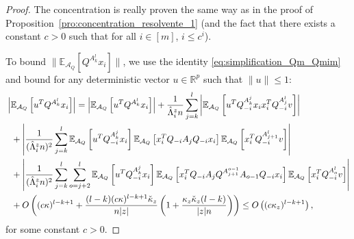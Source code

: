 \documentclass[a4papaer, titlepage]{book}
\begin{document}
\begin{proof}
  The concentration is really proven the same way as in the proof of Proposition~\ref{pro:concentration_resolvente_1} (and the fact that there exists a constant $c>0$ such that for all $i\in[m]$, $i \leq c^i$).

  To bound $\|\mathbb E_{\mathcal A_Q}[Q^{A_k^l}x_i]\|$, we use the identity \eqref{eq:simplification_Qm_Qmim} and bound for any deterministic vector $u\in \mathbb R^p$ such that $\|u\| \leq 1$:
  \begin{align*}
    &\left\vert \mathbb E_{\mathcal A_Q} \left[  u^TQ^{A_k^l}x_i \right] \right\vert
    = \left\vert \mathbb E_{\mathcal A_Q} \left[  u^TQ^{A_k^l}x_i \right] \right\vert
    + \frac{1}{\hat \Lambda_i^zn}\sum_{j=k}^l \left\vert \mathbb E_{\mathcal A_Q} \left[ u^TQ_{-i}^{A_k^{j}}x_ix_i^TQ_{-i}^{A_{j}^{l}}v \right] \right\vert \\
    &\hspace{0.2cm}  + \left\vert \frac{1}{(\hat \Lambda_i^zn)^2}\sum_{j=k}^l \mathbb E_{\mathcal A_Q} \left[u^T Q_{-i}^{A_k^{j}}x_i\right] \mathbb E_{\mathcal A_Q} \left[x_i^TQ_{-i}A_jQ_{-i}x_i\right] \mathbb E_{\mathcal A_Q} \left[x_i^TQ_{-i}^{A^{l}_{j+1}}v\right] \right\vert\\ 
    &\hspace{0.2cm} + \left\vert \frac{1}{(\hat\Lambda_i^zn)^2}\sum_{j=k}^l \sum_{o=j+2}^l \mathbb E_{\mathcal A_Q} \left[u^T Q_{-i}^{A_k^{j}}x_i\right] \mathbb E_{\mathcal A_Q} \left[x_i^TQ_{-i}A_jQ^{A_{j+1}^{o-1}}A_{o-1}Q_{-i}x_i \right] \mathbb E_{\mathcal A_Q} \left[x_i^TQ_{-i}^{A^{l}_{o}} v\right] \right\vert\\
    &\hspace{0.2cm}+ O \left( (c\kappa)^{l-k+1} +\frac{(l-k)(c\kappa)^{l-k+1} \check \kappa_z }{n|z|} \left( 1 + \frac{\kappa_z \check\kappa_z(l-k)}{|z|n} \right)\right)  \leq O \left((c\kappa_z)^{l-k+1} \right),
  \end{align*}
  for some constant $c>0$.
\end{proof}
\end{document}

